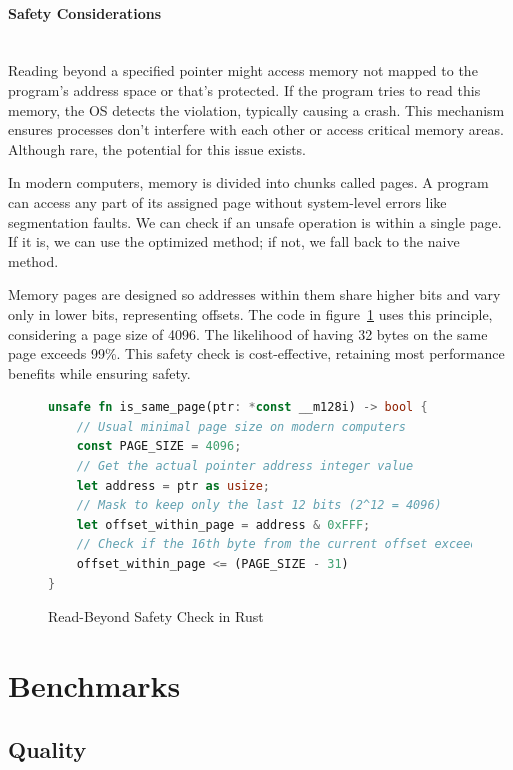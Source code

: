 \documentclass[10pt]{article}
\begin{document}
\paragraph{Safety Considerations}\leavevmode\\
Reading beyond a specified pointer might access memory not mapped to the program's address space or that's protected. If the program tries to read this memory, the OS detects the violation, typically causing a crash. This mechanism ensures processes don't interfere with each other or access critical memory areas. Although rare, the potential for this issue exists.

In modern computers, memory is divided into chunks called pages. A program can access any part of its assigned page without system-level errors like segmentation faults. We can check if an unsafe operation is within a single page. If it is, we can use the optimized method; if not, we fall back to the naive method.

Memory pages are designed so addresses within them share higher bits and vary only in lower bits, representing offsets. The code in figure~\ref{fig:check_page_example} uses this principle, considering a page size of 4096. The likelihood of having 32 bytes on the same page exceeds 99\%. This safety check is cost-effective, retaining most performance benefits while ensuring safety.

\begin{figure}[H]
\begin{lstlisting}[language=Rust, style=boxed]
unsafe fn is_same_page(ptr: *const __m128i) -> bool {
    // Usual minimal page size on modern computers
    const PAGE_SIZE = 4096;
    // Get the actual pointer address integer value
    let address = ptr as usize;
    // Mask to keep only the last 12 bits (2^12 = 4096)
    let offset_within_page = address & 0xFFF;
    // Check if the 16th byte from the current offset exceeds the page boundary
    offset_within_page <= (PAGE_SIZE - 31)
}
\end{lstlisting}
\caption{Read-Beyond Safety Check in Rust}
\label{fig:check_page_example}
\end{figure}

\clearpage
\section{Benchmarks}

\subsection{Quality}
\end{document}
